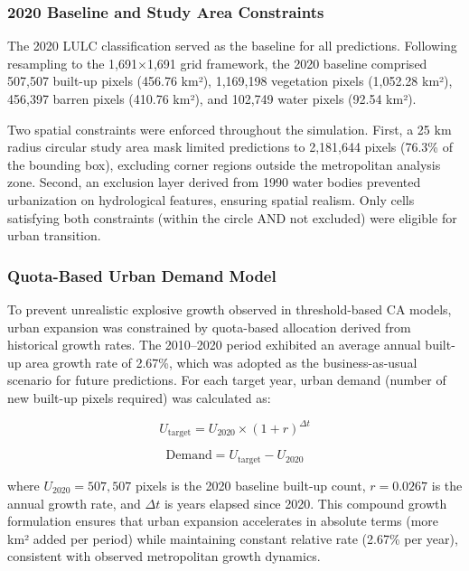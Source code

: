 \documentclass[12pt,a4paper]{article}
\begin{document}
\subsubsection{2020 Baseline and Study Area Constraints}

The 2020 LULC classification served as the baseline for all predictions. Following resampling to the 1,691$\times$1,691 grid framework, the 2020 baseline comprised 507,507 built-up pixels (456.76 km²), 1,169,198 vegetation pixels (1,052.28 km²), 456,397 barren pixels (410.76 km²), and 102,749 water pixels (92.54 km²).

Two spatial constraints were enforced throughout the simulation. First, a 25 km radius circular study area mask limited predictions to 2,181,644 pixels (76.3\% of the bounding box), excluding corner regions outside the metropolitan analysis zone. Second, an exclusion layer derived from 1990 water bodies prevented urbanization on hydrological features, ensuring spatial realism. Only cells satisfying both constraints (within the circle AND not excluded) were eligible for urban transition.

\subsubsection{Quota-Based Urban Demand Model}

To prevent unrealistic explosive growth observed in threshold-based CA models, urban expansion was constrained by quota-based allocation derived from historical growth rates. The 2010--2020 period exhibited an average annual built-up area growth rate of 2.67\%, which was adopted as the business-as-usual scenario for future predictions. For each target year, urban demand (number of new built-up pixels required) was calculated as:

\begin{equation}
U_{\text{target}} = U_{2020} \times (1 + r)^{\Delta t}
\label{eq:demand_growth}
\end{equation}

\begin{equation}
\text{Demand} = U_{\text{target}} - U_{2020}
\label{eq:demand_calc}
\end{equation}

where $U_{2020} = 507{,}507$ pixels is the 2020 baseline built-up count, $r = 0.0267$ is the annual growth rate, and $\Delta t$ is years elapsed since 2020. This compound growth formulation ensures that urban expansion accelerates in absolute terms (more km² added per period) while maintaining constant relative rate (2.67\% per year), consistent with observed metropolitan growth dynamics.
\end{document}
